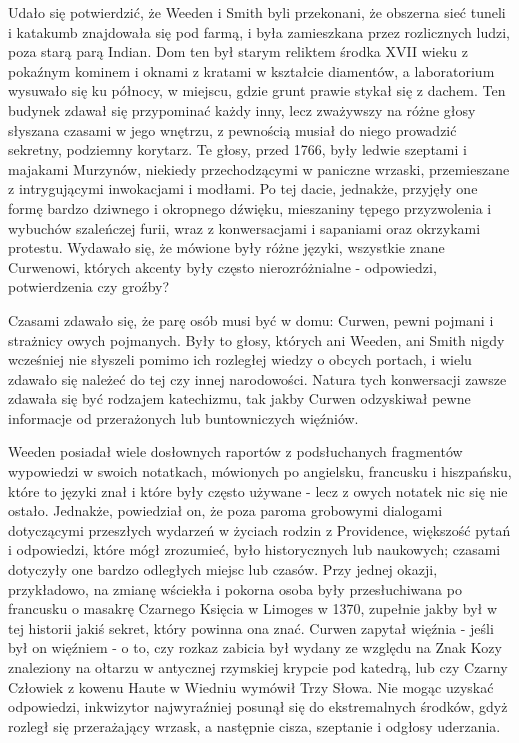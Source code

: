 Udało się potwierdzić, że Weeden i Smith byli przekonani, że obszerna sieć tuneli i katakumb znajdowała się pod farmą, i była zamieszkana przez rozlicznych ludzi, poza starą parą Indian. Dom ten był starym reliktem środka XVII wieku z pokaźnym kominem i oknami z kratami w kształcie diamentów, a laboratorium wysuwało się ku północy, w miejscu, gdzie grunt prawie stykał się z dachem. Ten budynek zdawał się przypominać każdy inny, lecz zważywszy na różne głosy słyszana czasami w jego wnętrzu, z pewnością musiał do niego prowadzić sekretny, podziemny korytarz. Te głosy, przed 1766, były ledwie szeptami i majakami Murzynów, niekiedy przechodzącymi w paniczne wrzaski, przemieszane z intrygującymi inwokacjami i modłami. Po tej dacie, jednakże, przyjęły one formę bardzo dziwnego i okropnego dźwięku, mieszaniny tępego przyzwolenia i wybuchów szaleńczej furii, wraz z konwersacjami i sapaniami oraz okrzykami protestu. Wydawało się, że mówione były różne języki, wszystkie znane Curwenowi, których akcenty były często nierozróżnialne - odpowiedzi, potwierdzenia czy groźby?

Czasami zdawało się, że parę osób musi być w domu: Curwen, pewni pojmani i strażnicy owych pojmanych. Były to głosy, których ani Weeden, ani Smith nigdy wcześniej nie słyszeli pomimo ich rozległej wiedzy o obcych portach, i wielu zdawało się należeć do tej czy innej narodowości. Natura tych konwersacji zawsze zdawała się być rodzajem katechizmu, tak jakby Curwen odzyskiwał pewne informacje od przerażonych lub buntowniczych więźniów. 

Weeden posiadał wiele dosłownych raportów z podsłuchanych fragmentów wypowiedzi w swoich notatkach, mówionych po angielsku, francusku i hiszpańsku, które to języki znał i które były często używane - lecz z owych notatek nic się nie ostało. Jednakże, powiedział on, że poza paroma grobowymi dialogami dotyczącymi przeszłych wydarzeń w życiach rodzin z Providence, większość pytań i odpowiedzi, które mógł zrozumieć, było historycznych lub naukowych; czasami dotyczyły one bardzo odległych miejsc lub czasów. Przy jednej okazji, przykładowo, na zmianę wściekła i pokorna osoba były przesłuchiwana po francusku o masakrę Czarnego Księcia w Limoges w 1370, zupełnie jakby był w tej historii jakiś sekret, który powinna ona znać. Curwen zapytał więźnia - jeśli był on więźniem - o to, czy rozkaz zabicia był wydany ze względu na Znak Kozy znaleziony na ołtarzu w antycznej rzymskiej krypcie pod katedrą, lub czy Czarny Człowiek z kowenu Haute w Wiedniu wymówił Trzy Słowa. Nie mogąc uzyskać odpowiedzi, inkwizytor najwyraźniej posunął się do ekstremalnych środków, gdyż rozległ się przerażający wrzask, a następnie cisza, szeptanie i odgłosy uderzania.

